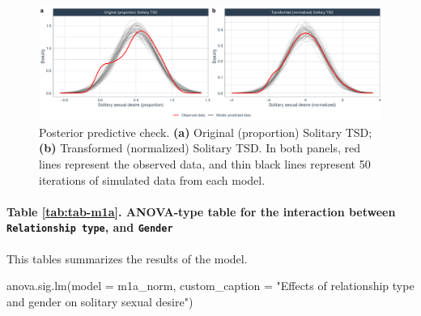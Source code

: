 \documentclass[
  bookmarksnumbered]{article}
\newenvironment{Shaded}{\begin{snugshade}}{\end{snugshade}}
\newcommand{\AttributeTok}[1]{\textcolor[rgb]{0.80,0.80,0.80}{#1}}
\newcommand{\FunctionTok}[1]{\textcolor[rgb]{0.94,0.94,0.56}{#1}}
\newcommand{\NormalTok}[1]{\textcolor[rgb]{0.80,0.80,0.80}{#1}}
\newcommand{\StringTok}[1]{\textcolor[rgb]{0.80,0.58,0.58}{#1}}
\begin{document}
\begin{figure}
\centering
\includegraphics{Sexual_Desire_Arousal_V2_files/figure-latex/ppc-m1a-1.pdf}
\caption{\label{fig:ppc-m1a}Posterior predictive check. \textbf{(a)} Original (proportion) Solitary TSD; \textbf{(b)} Transformed (normalized) Solitary TSD. In both panels, red lines represent the observed data, and thin black lines represent 50 iterations of simulated data from each model.}
\end{figure}

\paragraph{\texorpdfstring{Table \ref{tab:tab-m1a}. ANOVA-type table for the interaction between \texttt{Relationship\ type}, and \texttt{Gender}}{Table \ref{tab:tab-m1a}. ANOVA-type table for the interaction between Relationship type, and Gender}}\label{table-reftabtab-m1a.-anova-type-table-for-the-interaction-between-relationship-type-and-gender}

This tables summarizes the results of the model.

\begin{Shaded}
\begin{Highlighting}[]
\FunctionTok{anova.sig.lm}\NormalTok{(}\AttributeTok{model =}\NormalTok{ m1a\_norm, }\AttributeTok{custom\_caption =} \StringTok{"Effects of relationship type and gender on }
\StringTok{          solitary sexual desire"}\NormalTok{)}
\end{Highlighting}
\end{Shaded}
\end{document}
